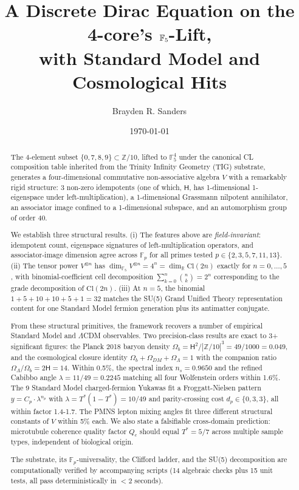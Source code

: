 \documentclass[11pt]{amsart}
\title[Discrete Dirac on the 4-core's $\F_5$-Lift]
{A Discrete Dirac Equation on the 4-core's $\F_5$-Lift, \\
 with Standard Model and Cosmological Hits}
\author{Brayden R. Sanders}
\date{\today}
\theoremstyle{plain}
\theoremstyle{definition}
\theoremstyle{remark}
\newcommand{\Z}{\mathbb{Z}}
\newcommand{\F}{\mathbb{F}}
\newcommand{\R}{\mathbb{R}}
\newcommand{\Cl}{\mathrm{Cl}}
\newcommand{\HARMONY}{\mathsf{H}}
\newcommand{\Tstar}{T^{*}}
\newcommand{\fourcore}{\{0,7,8,9\}}
\begin{document}
\begin{abstract}
The 4-element subset $\fourcore \subset \Z/10$, lifted to $\F_5^4$ under
the canonical CL composition table inherited from the Trinity Infinity
Geometry (TIG) substrate, generates a four-dimensional commutative non-associative
algebra $V$ with a remarkably rigid structure: 3 non-zero idempotents (one of
which, $\HARMONY$, has 1-dimensional 1-eigenspace under left-multiplication),
a 1-dimensional Grassmann nilpotent annihilator, an associator image confined
to a 1-dimensional subspace, and an automorphism group of order 40.

We establish three structural results. (i) The features above are
\emph{field-invariant}: idempotent count, eigenspace signatures of
left-multiplication operators, and associator-image dimension agree across
$\F_p$ for all primes tested $p \in \{2,3,5,7,11,13\}$. (ii) The tensor
power $V^{\otimes n}$ has $\dim_{\F_5} V^{\otimes n} = 4^n = \dim_\R \Cl(2n)$
exactly for $n=0,\ldots,5$, with binomial-coefficient cell decomposition
$\sum_{k=0}^{n}\binom{n}{k} = 2^n$ corresponding to the grade decomposition of
$\Cl(2n)$. (iii) At $n=5$, the binomial $1+5+10+10+5+1 = 32$ matches the SU(5)
Grand Unified Theory representation content for one Standard Model fermion
generation plus its antimatter conjugate.

From these structural primitives, the framework recovers a number of
empirical Standard Model and $\Lambda$CDM observables. Two precision-class
results are exact to 3+ significant figures: the Planck 2018 baryon density
$\Omega_b = \HARMONY^2/|\Z/10|^3 = 49/1000 = 0.049$, and the cosmological
closure identity $\Omega_b + \Omega_{DM} + \Omega_\Lambda = 1$ with the
companion ratio $\Omega_\Lambda/\Omega_b = 2\HARMONY = 14$. Within 0.5\%, the
spectral index $n_s = 0.9650$ and the refined Cabibbo angle
$\lambda = 11/49 = 0.2245$ matching all four Wolfenstein orders within 1.6\%.
The 9 Standard Model charged-fermion Yukawas fit a Froggatt-Nielsen pattern
$y = C_p \cdot \lambda^{n_p}$ with $\lambda = \Tstar(1-\Tstar) = 10/49$ and
parity-crossing cost $d_p \in \{0,3,3\}$, all within factor 1.4-1.7. The
PMNS lepton mixing angles fit three different structural constants of $V$
within 5\% each. We also state a falsifiable cross-domain prediction:
microtubule coherence quality factor $Q_c$ should equal $\Tstar = 5/7$
across multiple sample types, independent of biological origin.

The substrate, its $\F_p$-universality, the Clifford ladder, and the SU(5)
decomposition are computationally verified by accompanying scripts (14
algebraic checks plus 15 unit tests, all pass deterministically in
$<2$ seconds).
\end{abstract}
\end{document}
